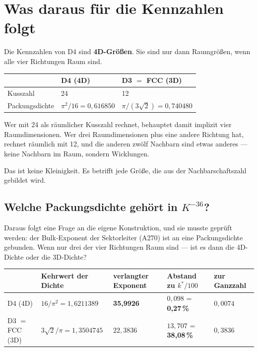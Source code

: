 \chapter{Was daraus für die Kennzahlen folgt}

Die Kennzahlen von D4 sind \textbf{4D-Größen}. Sie sind nur dann
Raumgrößen, wenn alle vier Richtungen Raum sind.

\begin{center}
\begin{tabular}{lll}
\toprule
 & D4 (4D) & D3 $=$ FCC (3D) \\
\midrule
Kusszahl & 24 & 12 \\
Packungsdichte & $\pi^2/16 = 0{,}616850$ & $\pi/(3\sqrt2) = 0{,}740480$ \\
\bottomrule
\end{tabular}
\end{center}

Wer mit 24 als räumlicher Kusszahl rechnet, behauptet damit implizit
vier Raumdimensionen. Wer drei Raumdimensionen plus eine andere
Richtung hat, rechnet räumlich mit 12, und die anderen zwölf Nachbarn
sind etwas anderes --- keine Nachbarn im Raum, sondern Wicklungen.

Das ist keine Kleinigkeit. Es betrifft jede Größe, die aus der
Nachbarschaftszahl gebildet wird.

\section{Welche Packungsdichte gehört in \texorpdfstring{$K^{-36}$}{K hoch -36}?}

Daraus folgt eine Frage an die eigene Konstruktion, und sie musste
geprüft werden: der Bulk-Exponent der Sektorleiter (A270) ist an eine
Packungsdichte gebunden. Wenn nur drei der vier Richtungen Raum sind
--- ist es dann die 4D-Dichte oder die 3D-Dichte?

\begin{center}
\small
\begin{tabular}{lllll}
\toprule
 & Kehrwert der Dichte & verlangter Exponent
 & Abstand zu $k^*/100$ & zur Ganzzahl \\
\midrule
D4 (4D) & $16/\pi^2 = 1{,}6211389$ & \textbf{35{,}9926}
  & $0{,}098$ = \textbf{0{,}27\,\%} & $0{,}0074$ \\
D3 $=$ FCC (3D) & $3\sqrt2/\pi = 1{,}3504745$ & $22{,}3836$
  & $13{,}707$ = \textbf{38{,}08\,\%} & $0{,}3836$ \\
\bottomrule
\end{tabular}
\end{center}

